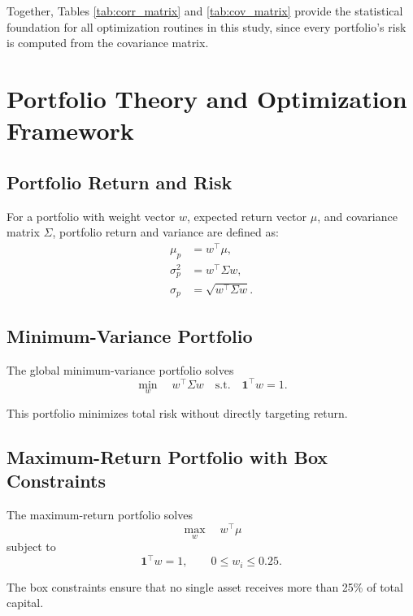 \documentclass[wcp]{jmlr}
\begin{document}
Together, Tables \ref{tab:corr_matrix} and \ref{tab:cov_matrix} provide the statistical foundation for all optimization routines in this study, since every portfolio’s risk is computed from the covariance matrix.

\section{Portfolio Theory and Optimization Framework}

\subsection{Portfolio Return and Risk}

For a portfolio with weight vector $w$, expected return vector $\mu$, and covariance matrix $\Sigma$, portfolio return and variance are defined as:
\begin{align}
\mu_p &= w^\top \mu, \\
\sigma_p^2 &= w^\top \Sigma w, \\
\sigma_p &= \sqrt{w^\top \Sigma w}.
\end{align}

\subsection{Minimum-Variance Portfolio}

The global minimum-variance portfolio solves
\begin{equation}
\min_w \quad w^\top \Sigma w \quad \text{s.t.} \quad \mathbf{1}^\top w = 1.
\end{equation}

This portfolio minimizes total risk without directly targeting return.

\subsection{Maximum-Return Portfolio with Box Constraints}

The maximum-return portfolio solves
\begin{equation}
\max_w \quad w^\top \mu
\end{equation}
subject to
\begin{equation}
\mathbf{1}^\top w = 1, \qquad 0 \leq w_i \leq 0.25.
\end{equation}

The box constraints ensure that no single asset receives more than 25\% of total capital.
\end{document}
